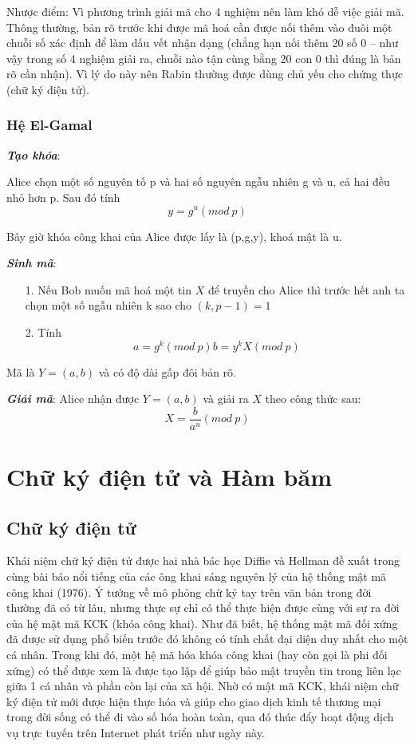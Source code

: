 \documentclass[a4paper,12pt]{report}
\begin{document}
Nhược điểm: Vì phương trình giải mã cho 4 nghiệm nên làm khó dễ việc giải mã. Thông thường, bản rõ trước khi được mã hoá cần được nối thêm vào đuôi một chuỗi số xác định để làm dấu vết nhận dạng (chẳng hạn nối thêm 20 số 0 – như vậy trong số 4 nghiệm giải ra, chuỗi nào tận cùng bằng 20 con 0 thì đúng là bản rõ cần nhận). Vì lý do này nên Rabin thường được dùng chủ yếu cho chứng thực (chữ ký điện tử).

\subsubsection{Hệ El-Gamal}
\textbf{\textit{Tạo khóa}}:

Alice chọn một số nguyên tố p và hai số nguyên ngẫu nhiên g và u, cả hai đều nhỏ hơn p. Sau đó tính 
\begin{displaymath}
y = g^u (mod \ p)
\end{displaymath}

Bây giờ khóa công khai của Alice được lấy là (p,g,y), khoá mật là u.

\textbf{\textit{Sinh mã}}:
\begin{itemize}
\item[1. ] Nếu Bob muốn mã hoá một tin $X$ để truyền cho Alice thì trước hết anh ta chọn một số ngẫu nhiên k sao cho $(k,p-1) = 1$
\item[2. ] Tính 
\begin{displaymath}
a = g^k(mod \ p)
b = y^kX(mod \ p)
\end{displaymath}
\end{itemize}

Mã là $Y = (a,b)$ và có độ dài gấp đôi bản rõ.

\textbf{\textit{Giải mã}}: Alice nhận được $Y = (a,b)$ và giải ra $X$ theo công thức sau:
\begin{displaymath}
X = \frac{b}{a^u} (mod \ p)
\end{displaymath}
\section{Chữ ký điện tử và Hàm băm}
\subsection*{Chữ ký điện tử}
Khái niệm chữ ký điện tử được hai nhà bác học Diffie và Hellman đề xuất trong
cùng bài báo nổi tiếng của các ông khai sáng nguyên lý của hệ thống mật mã công khai (1976). Ý tưởng về mô phỏng chữ ký tay trên văn bản trong đời thường đã có từ lâu, nhưng thực sự chỉ có thể thực hiện được cùng với sự ra đời của hệ mật mã KCK (khóa công khai). Như đã biết, hệ thống mật mã đối xứng đã được sử dụng phổ biến trước đó không có tính chất đại diện duy nhất cho một cá nhân. Trong khi đó, một hệ mã hóa khóa công khai (hay còn gọi là phi đối xứng) có thể được xem là được tạo lập để giúp bảo mật truyền tin trong liên lạc giữa 1 cá nhân và phần còn lại của xã hội. Nhờ có mật mã KCK, khái niệm chữ ký điện tử mới được hiện thực hóa và giúp cho giao dịch kinh tế thương mại trong đời sống có thể đi vào số hóa hoàn toàn, qua đó thúc đẩy hoạt động dịch vụ trực tuyến trên Internet phát triển như ngày này. 
\end{document}

